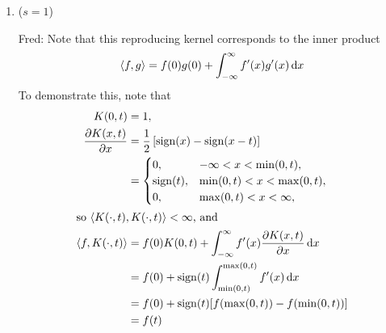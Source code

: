 \documentclass[12pt]{article}
\newcommand{\dif}{{\rm d}}
\DeclareMathOperator{\sign}{sign}
\newcommand{\FJH}[1]{{\color{blue}Fred: #1}}
\begin{document}
\begin{enumerate}
    \item ($s=1$)
    \FJH{Note that this reproducing kernel corresponds to the inner product
    \begin{equation}
        \langle f,g \rangle = f(0) g(0)  + \int_{-\infty}^\infty f'(x) g'(x) \, \dif x
    \end{equation}
    To demonstrate this, note that
    \begin{align*}
        K(0,t) &= 1, \\
        \frac{\partial K(x,t)}{\partial x} &= \frac 12 \left[\sign(x) - \sign(x - t) \right] \\
        & = \begin{cases} 0, & -\infty < x < \min(0,t), \\
        \sign(t), & \min(0,t) < x < \max(0,t), \\
        0, & \max(0,t) < x < \infty,
        \end{cases}
        \\
        \intertext{so $\langle K(\cdot,t), K(\cdot,t) \rangle < \infty $, and}
        \langle f, K(\cdot,t) \rangle &= f(0) K(0,t) + \int_{-\infty}^\infty f'(x) \frac{\partial K(x,t)}{\partial x} \, \dif x \\
        & = f(0) + \sign(t) \int_{\min(0,t)}^{\max(0,t)} f'(x)  \, \dif x \\    
        & = f(0) + \sign(t) [f(\max(0,t)) - f(\min(0,t))] \\    
        & = f(t)
        \end{align*}
        
}
\end{enumerate}
\end{document}
